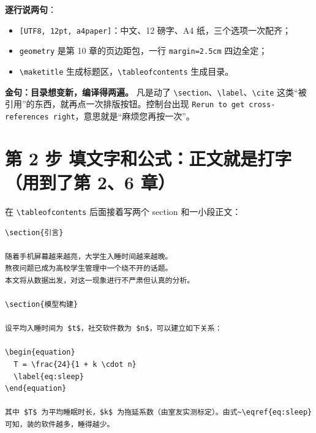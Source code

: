 \textbf{逐行说两句}：

\begin{itemize}
\setlength{\itemsep}{2pt}
\item \texttt{[UTF8, 12pt, a4paper]}：中文、12 磅字、A4 纸，三个选项一次配齐；
\item \texttt{geometry} 是第 10 章的页边距包，一行 \texttt{margin=2.5cm} 四边全定；
\item \texttt{\textbackslash{}maketitle} 生成标题区，\texttt{\textbackslash{}tableofcontents} 生成目录。
\end{itemize}

\begin{notebox}
\textbf{金句：目录想变新，编译得两遍。} 凡是动了 \texttt{\textbackslash{}section}、\texttt{\textbackslash{}label}、\texttt{\textbackslash{}cite} 这类“被引用”的东西，就再点一次排版按钮。控制台出现 \texttt{Rerun to get cross-references right}，意思就是“麻烦您再按一次”。
\end{notebox}

\section*{第 2 步 填文字和公式：正文就是打字（用到了第 2、6 章）}

在 \texttt{\textbackslash{}tableofcontents} 后面接着写两个 section 和一小段正文：

\begin{lstlisting}
\section{引言}

随着手机屏幕越来越亮，大学生入睡时间越来越晚。
熬夜问题已成为高校学生管理中一个绕不开的话题。
本文将从数据出发，对这一现象进行不严肃但认真的分析。

\section{模型构建}

设平均入睡时间为 $t$，社交软件数为 $n$，可以建立如下关系：

\begin{equation}
  T = \frac{24}{1 + k \cdot n}
  \label{eq:sleep}
\end{equation}

其中 $T$ 为平均睡眠时长，$k$ 为拖延系数（由室友实测标定）。由式~\eqref{eq:sleep} 可知，装的软件越多，睡得越少。
\end{lstlisting}

